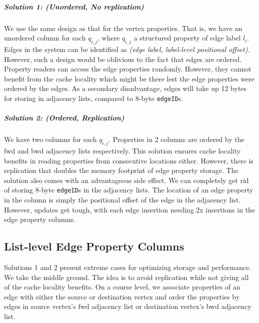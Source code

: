 \vspace{-12pt}
\subparagraph{Solution 1: (Unordered, No replication) } We use the same design as that for the vertex properties. That is, we have an unordered column for each $q_{i,j}$, where $q_{i,j}$ a structured property of edge label $l_i$. Edges in the system can be identified as \emph{(edge label, label-level positional offset)}. However, such a design would be oblivious to the fact that edges are ordered. Property readers can access the edge properties randomly. However, they cannot benefit from the cache locality which might be there lest the edge properties were ordered by the edges. As a secondary disadvantage, edges will take up 12 bytes for storing in adjacency lists, compared to 8-byte \texttt{edgeID}s.

\vspace{-12pt}
\subparagraph{Solution 2: (Ordered, Replication) } We have two columns for each $q_{i,j}$. Properties in 2 columns are ordered by the \gls{fwd} and \gls{bwd} adjacency lists respectively. This solution ensures cache locality benefits in reading properties from consecutive locations either. However, there is replication that doubles the memory footprint of edge property storage. The solution also comes with an advantageous side effect. We can completely get rid of storing 8-byte \texttt{edgeID}s in the adjacency lists. The location of an edge property in the column is simply the positional offset of the edge in the adjacency list. However, updates get tough, with each edge insertion needing 2x insertions in the edge property columns.

\subsection{List-level Edge Property Columns}

Solutions 1 and 2 present extreme cases for optimizing storage and performance. We take the middle ground. The idea is to avoid replication while not giving all of the cache locality benefits. On a course level, we associate properties of an edge with either the source or destination vertex and order the properties by edges in source vertex's \gls{fwd} adjacency list or destination vertex's \gls{bwd} adjacency list.

